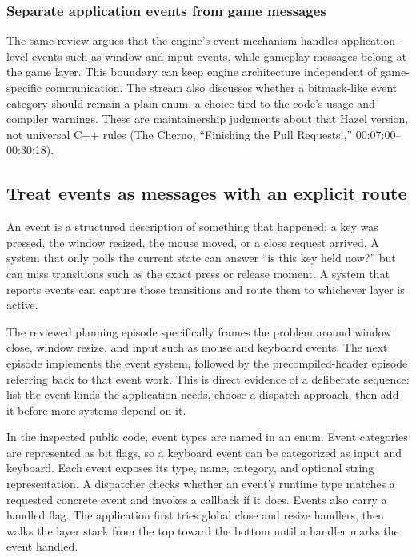 \subsubsection{Separate application events from game messages}\label{05-engine-i-ch013-separate-application-events-from-game-messages}

\hypertarget{05-engine-i-ch013-separate-application-events-from-game-messages}{}

The same review argues that the engine's event mechanism handles application-level events such as window and input events, while gameplay messages belong at the game layer. This boundary can keep engine architecture independent of game-specific communication. The stream also discusses whether a bitmask-like event category should remain a plain enum, a choice tied to the code's usage and compiler warnings. These are maintainership judgments about that Hazel version, not universal C++ rules (The Cherno, ``Finishing the Pull Requests!,'' 00:07:00--00:30:18).

\subsection{Treat events as messages with an explicit route}\label{05-engine-i-ch013-treat-events-as-messages-with-an-explicit-route}

\hypertarget{05-engine-i-ch013-treat-events-as-messages-with-an-explicit-route}{}

An event is a structured description of something that happened: a key was pressed, the window resized, the mouse moved, or a close request arrived. A system that only polls the current state can answer ``is this key held now?'' but can miss transitions such as the exact press or release moment. A system that reports events can capture those transitions and route them to whichever layer is active.

The reviewed planning episode specifically frames the problem around window close, window resize, and input such as mouse and keyboard events. The next episode implements the event system, followed by the precompiled-header episode referring back to that event work. This is direct evidence of a deliberate sequence: list the event kinds the application needs, choose a dispatch approach, then add it before more systems depend on it.

In the inspected public code, event types are named in an enum. Event categories are represented as bit flags, so a keyboard event can be categorized as input and keyboard. Each event exposes its type, name, category, and optional string representation. A dispatcher checks whether an event's runtime type matches a requested concrete event and invokes a callback if it does. Events also carry a handled flag. The application first tries global close and resize handlers, then walks the layer stack from the top toward the bottom until a handler marks the event handled.

